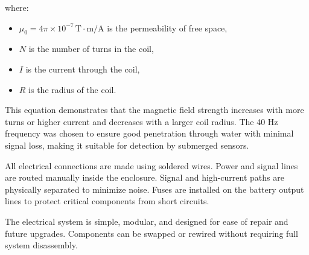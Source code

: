where:
\begin{itemize}
    \item \( \mu_0 = 4\pi \times 10^{-7} \, \text{T}\cdot\text{m/A} \) is the permeability of free space,
    \item \( N \) is the number of turns in the coil,
    \item \( I \) is the current through the coil,
    \item \( R \) is the radius of the coil.
\end{itemize}

This equation demonstrates that the magnetic field strength increases with more turns or higher current and decreases with a larger coil radius. The 40 Hz frequency was chosen to ensure good penetration through water with minimal signal loss, making it suitable for detection by submerged sensors.

All electrical connections are made using soldered wires. Power and signal lines are routed manually inside the enclosure. Signal and high-current paths are physically separated to minimize noise. Fuses are installed on the battery output lines to protect critical components from short circuits.

The electrical system is simple, modular, and designed for ease of repair and future upgrades. Components can be swapped or rewired without requiring full system disassembly.